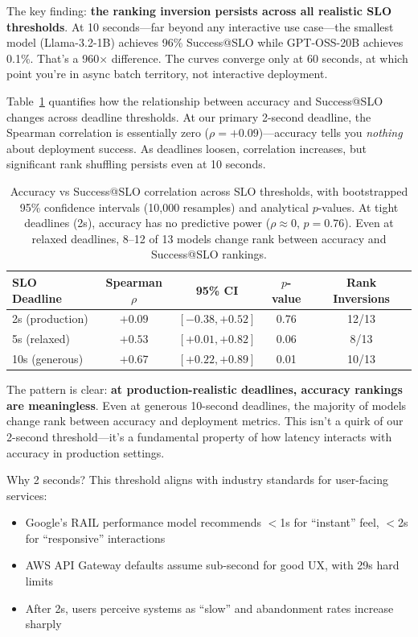 \documentclass[11pt]{article}
\begin{document}
The key finding: \textbf{the ranking inversion persists across all realistic SLO thresholds}.
At 10 seconds---far beyond any interactive use case---the smallest model (Llama-3.2-1B) achieves 96\% Success@SLO while GPT-OSS-20B achieves 0.1\%. That's a 960$\times$ difference.
The curves converge only at 60 seconds, at which point you're in async batch territory, not interactive deployment.

Table~\ref{tab:slo-correlation} quantifies how the relationship between accuracy and Success@SLO changes across deadline thresholds.
At our primary 2-second deadline, the Spearman correlation is essentially zero ($\rho = +0.09$)---accuracy tells you \emph{nothing} about deployment success.
As deadlines loosen, correlation increases, but significant rank shuffling persists even at 10 seconds.

\begin{table}[t]
\centering
\caption{Accuracy vs Success@SLO correlation across SLO thresholds, with bootstrapped 95\% confidence intervals (10{,}000 resamples) and analytical $p$-values. At tight deadlines (2s), accuracy has no predictive power ($\rho \approx 0$, $p = 0.76$). Even at relaxed deadlines, 8--12 of 13 models change rank between accuracy and Success@SLO rankings.}
\label{tab:slo-correlation}
\begin{tabular}{lcccc}
\toprule
\textbf{SLO Deadline} & \textbf{Spearman $\rho$} & \textbf{95\% CI} & \textbf{$p$-value} & \textbf{Rank Inversions} \\
\midrule
2s (production) & $+0.09$ & $[-0.38, +0.52]$ & 0.76 & 12/13 \\
5s (relaxed) & $+0.53$ & $[+0.01, +0.82]$ & 0.06 & 8/13 \\
10s (generous) & $+0.67$ & $[+0.22, +0.89]$ & 0.01 & 10/13 \\
\bottomrule
\end{tabular}
\end{table}

The pattern is clear: \textbf{at production-realistic deadlines, accuracy rankings are meaningless}.
Even at generous 10-second deadlines, the majority of models change rank between accuracy and deployment metrics.
This isn't a quirk of our 2-second threshold---it's a fundamental property of how latency interacts with accuracy in production settings.

Why 2 seconds?
This threshold aligns with industry standards for user-facing services:
\begin{itemize}[leftmargin=12pt]
    \item Google's RAIL performance model recommends $<$1s for ``instant'' feel, $<$2s for ``responsive'' interactions
    \item AWS API Gateway defaults assume sub-second for good UX, with 29s hard limits
    \item After 2s, users perceive systems as ``slow'' and abandonment rates increase sharply~\citep{akamai2017performance}
\end{itemize}
\end{document}
